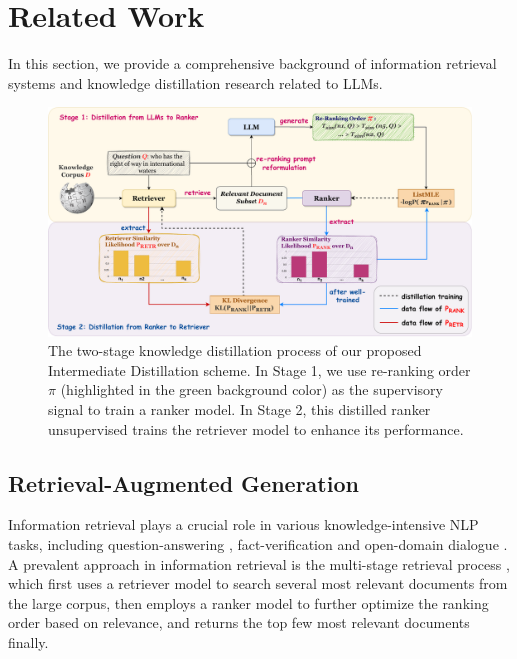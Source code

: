 \section{Related Work}
In this section, we provide a comprehensive background of information retrieval systems and knowledge distillation research related to LLMs.

\begin{figure}
    \centering
    \includegraphics[width=1.0\textwidth]{latex/pic/fig2-3.pdf}
    \caption{The two-stage knowledge distillation process of our proposed Intermediate Distillation scheme. In Stage 1, we use re-ranking order $\pi$ (highlighted in the green background color) as the supervisory signal to train a ranker model. In Stage 2, this distilled ranker unsupervised trains the retriever model to enhance its performance.}
    \label{fig:02}
\end{figure}

\subsection{Retrieval-Augmented Generation}
Information retrieval plays a crucial role in various knowledge-intensive NLP tasks, including question-answering \cite{siriwardhana2023improving, zhang2024raft}, fact-verification \cite{hang2024trumorgpt, khaliq2024ragar} and open-domain dialogue \cite{wang2024unims, shuster2021retrieval}.
A prevalent approach in information retrieval is the multi-stage retrieval process \cite{nogueira2020document}, which first uses a retriever model to search several most relevant documents from the large corpus, then employs a ranker model to further optimize the ranking order based on relevance, and returns the top few most relevant documents finally.

